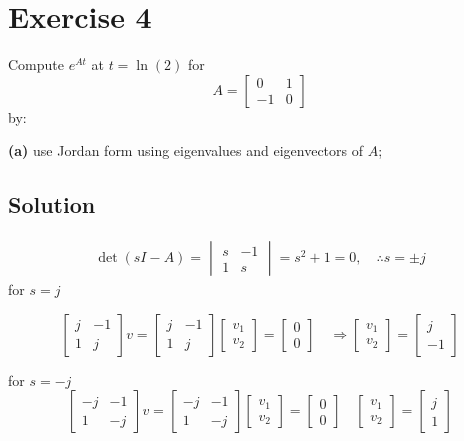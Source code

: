\documentclass[12pt,a4paper]{article}
\begin{document}
\section*{Exercise 4}
Compute $e^{At}$ at $t=\ln(2)$ for
\[
A=\begin{bmatrix}0&1\\-1&0\end{bmatrix}
\]
by:

\needspace{6cm}
\textbf{(a)} use Jordan form using eigenvalues and eigenvectors of $A$;
\subsection*{Solution}
\begin{align*}
	\det (sI -A) = \begin{vmatrix}
		s & -1 \\ 1 & s
	\end{vmatrix} = s^2 + 1 = 0, \quad \therefore s = \pm j
\end{align*}
for $s = j$

\[
\begin{bmatrix}
	j & -1 \\ 1 & j
\end{bmatrix} v = \begin{bmatrix}
	j & -1 \\ 1 & j
\end{bmatrix}\begin{bmatrix}
v_1 \\ v_2
\end{bmatrix} = \begin{bmatrix}
0 \\ 0
\end{bmatrix} \quad \Rightarrow \begin{bmatrix}
v_1 \\ v_2 
\end{bmatrix} = \begin{bmatrix}
j \\ -1
\end{bmatrix}
\]

for $s = -j$
\[
\begin{bmatrix}
	-j & -1 \\ 1& -j 
\end{bmatrix} v = \begin{bmatrix}
-j & -1 \\ 1& -j 
\end{bmatrix}\begin{bmatrix}
v_1 \\ v_2
\end{bmatrix} = \begin{bmatrix}
0 \\ 0
\end{bmatrix} \quad \begin{bmatrix}
v_1 \\ v_2
\end{bmatrix} = \begin{bmatrix}
j \\ 1
\end{bmatrix}
\]
\end{document}
